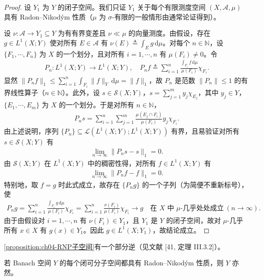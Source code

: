 \documentclass[../../main.tex]{subfiles}%
\begin{document}
\begin{proof}
设 $Y_1$ 为 $Y$ 的闭子空间。我们只证 $Y_1$ 关于每个有限测度空间 $(X,\mathcal{A},\mu)$ 具有 Radon--Nikodým 性质（$\mu$ 为 $\sigma$-有限的一般情形由通常论证得到）。

设 $\nu:\mathcal{A}\to Y_1\subseteq Y$ 为有有界变差且 $\nu\ll\mu$ 的向量测度。由假设，存在 $g\in L^1(X;Y)$ 使对所有 $E\in\mathcal{A}$ 有 $\nu(E)\triangleq \int_E g\,\mathrm{d}\mu$。对每个 $n\in\mathbb{N}$，设 $\{F_1,\cdots ,F_n\}$ 为 $X$ 的一个划分，且对所有 $i=1,\cdots ,n$ 有 $\mu(F_i)\neq0$。令
\begin{align*}
P_n:L^1(X;Y)\to L^1(X;Y),\quad P_nf\triangleq \sum_{i=1}^n\frac{\int_{F_i}f\,\mathrm{d}\mu}{\mu(F_i)}\chi_{F_i}.
\end{align*}
显然 $\|P_nf\|_1\leqslant\sum_{i=1}^n\int_{F_i}\|f\|_Y\,\mathrm{d}\mu=\|f\|_1$，故 $P_n$ 是范数 $\|P_n\|\leqslant1$ 的有界线性算子（$n\in\mathbb{N}$）。此外，设 $s\in\mathcal{S}(X;Y)$，$s=\sum_{j=1}^m y_j\chi_{E_j}$，其中 $y_j\in Y$，$\{E_1,\cdots ,E_m\}$ 为 $X$ 的一个划分。于是对所有 $n\in\mathbb{N}$，
\begin{align*}
P_ns=\sum_{i=1}^n\sum_{j=1}^m\frac{\mu(E_j\cap F_i)}{\mu(F_i)}y_j\chi_{F_i}.
\end{align*}
由上述说明，序列 $\{P_n\}\subseteq\mathcal{L}(L^1(X;Y);L^1(X;Y))$ 有界，且易验证对所有 $s\in\mathcal{S}(X;Y)$ 有
\begin{align*}
\lim_{n\to\infty}\|P_ns-s\|_1=0.
\end{align*}
由 $\mathcal{S}(X;Y)$ 在 $L^1(X;Y)$ 中的稠密性得，对所有 $f\in L^1(X;Y)$ 有
\begin{align*}
\lim_{n\to\infty}\|P_nf-f\|_1=0.
\end{align*}
特别地，取 $f=g$ 时此式成立，故存在 $\{P_ng\}$ 的一个子列（为简便不重新标号），使
\begin{align*}
P_ng=\sum_{i=1}^n\frac{\int_{F_i}g\,\mathrm{d}\mu}{\mu(F_i)}\chi_{F_i}=\sum_{i=1}^n\frac{\nu(F_i)}{\mu(F_i)}\chi_{F_i}\to g\quad\text{在 }X\text{ 中 }\mu\text{-几乎处处成立}\ (n\to\infty).
\end{align*}
由于由假设对 $i=1,\cdots ,n$ 有 $\nu(F_i)\in Y_1$，且 $Y_1$ 是 $Y$ 的闭子空间，故对 $\mu$-几乎所有 $x\in X$ 有 $g(x)\in Y_1$。因此 $g\in L^1(X;Y_1)$，故结论成立。
\end{proof}

\cref{proposition:ch04-RNP子空间}有一个部分逆（见文献 [41, 定理 III.3.2]）。

\begin{proposition}\label{proposition:ch04-RNP可分子空间}
若 Banach 空间 $Y$ 的每个闭可分子空间都具有 Radon--Nikodým 性质，则 $Y$ 亦然。
\end{proposition}
\end{document}
